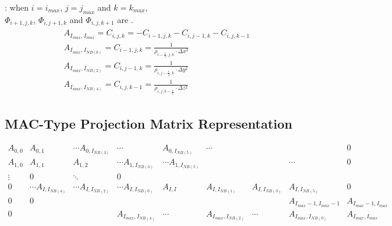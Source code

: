 \documentclass{article}
\numberwithin{equation}{subsection}
\begin{document}
: when $i = i_{max}$, $j = j_{max}$ and $k = k_{max}$, \\
$\Phi_{i+1,j,k}$, $\Phi_{i,j+1,k}$ and $\Phi_{i,j,k+1}$ are .
\begin{align}
\begin{split}
& A_{I_{max}, I_{max}} = C_{i,j,k} = - C_{i-1,j,k} - C_{i,j-1,k} - C_{i,j,k-1}\\
& A_{I_{max}, I_{NB(0)}} = C_{i-1,j,k} = \frac{1}{\rho_{i-\frac{1}{2},j,k} \cdot \Delta x^2} \\
& A_{I_{max}, I_{NB(2)}} = C_{i,j-1,k} = \frac{1}{\rho_{i,j-\frac{1}{2},k} \cdot \Delta y^2} \\
& A_{I_{max}, I_{NB(4)}} = C_{i,j,k-1} = \frac{1}{\rho_{i,j,k-\frac{1}{2}} \cdot \Delta z^2}
\end{split}
\end{align}





\subsection{MAC-Type Projection Matrix Representation}
\begin{equation}
\begin{smallmatrix}
A_{0,0} & A_{0,1} & \cdots A_{0,I_{NB(3)}}& \cdots & A_{0,I_{NB(5)}} & \cdots & & & 0 \\
A_{1,0} & A_{1,1} & A_{1,2} & \cdots A_{1,I_{NB(3)}} & \cdots A_{1,I_{NB(5)}} & & & \cdots & 0 \\
 \vdots& 0  & \ddots & 0 & & & \\ 
0 &\cdots A_{I,I_{NB(4)}}& \cdots A_{I,I_{NB(2)}} &\cdots A_{I,I_{NB(0)}} & A_{I,I} & A_{I,I_{NB(1)}} & A_{I,I_{NB(3)}} & A_{I,I_{NB(5)}}  &0 \\
0 & 0 & & & &  & & A_{I_{max}-1,I_{max}-1} & A_{I_{max}-1,I_{max}} \\
0 & & & A_{I_{max},I_{NB(4)}} & \cdots &A_{I_{max},I_{NB(2)}} & \cdots & A_{I_{max},I_{NB(0)}}  & A_{I_{max},I_{max}}
\end{smallmatrix}
\end{equation}

\end{document}
